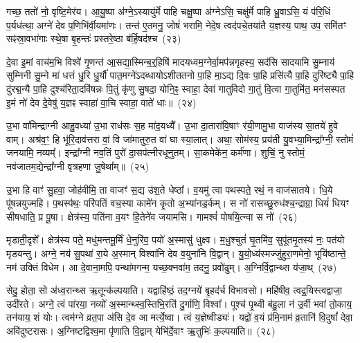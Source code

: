 गच्छ॒ ततो॑ नो॒ वृष्टि॒मेर॑य। आ॒यु॒ष्पा अ॑ग्ने॒\-ऽस्यायु॑र्मे पाहि चक्षु॒ष्पा अ॑ग्ने\-ऽसि॒ चक्षु॑र्मे पाहि ध्रु॒वा\-ऽसि॒ यं प॑रि॒धिं प॒र्यध॑त्था॒ अग्ने॑ देव प॒णिभि॑र्वी॒यमा॑णः। तन्त॑ ए॒तमनु॒ जोषं॑ भरामि॒ नेदे॒ष त्वद॑पचे॒तया॑तै य॒ज्ञस्य॒ पाथ॒ उप॒ समि॑तꣳ सꣴस्रा॒वभा॑गाः स्थे॒षा बृ॒हन्तः॑ प्रस्तरे॒ष्ठा ब॑र्\mbox{}हि॒षद॑श्च~(२३)\ip

दे॒वा इ॒मां वाच॑म॒भि विश्वे॑ गृ॒णन्त॑ आ॒सद्या॒स्मिन्ब॒र्॒हिषि॑ मादयध्वम॒ग्नेर्वा॒मप॑न्नगृहस्य॒ सद॑सि सादयामि सु॒म्नाय॑ सुम्निनी सु॒म्ने मा॑ धत्तं धु॒रि धु॒र्यौ॑ पात॒मग्ने॑\-ऽदब्धायो\-ऽशीततनो पा॒हि मा॒\-ऽद्य दि॒वः पा॒हि प्रसि॑त्यै पा॒हि दुरि॑ष्ट्यै पा॒हि दु॑रद्म॒न्यै पा॒हि दुश्च॑रिता॒दवि॑षन्नः पि॒तुं कृ॑णु सु॒षदा॒ योनि॒ꣴ॒ स्वाहा॒ देवा॑ गातुविदो गा॒तुं वि॒त्वा गा॒तुमि॑त॒ मन॑सस्पत इ॒मं नो॑ देव दे॒वेषु॑ य॒ज्ञꣴ स्वाहा॑ वा॒चि स्वाहा॒ वाते॑ धाः॥~(२४)\ip

{\anuvakamend[{दिव॑ञ्च वि॒त्वा गा॒तुन्त्रयो॑दश च}]}

उ॒भा वा॑मिन्द्राग्नी आहु॒वध्या॑ उ॒भा राध॑सः स॒ह मा॑द॒यध्यै᳚। उ॒भा दा॒तारा॑वि॒षाꣳ र॑यी॒णामु॒भा वाज॑स्य सा॒तये॑ हुवे वाम्। अश्र॑व॒ꣳ॒ हि भू॑रि॒दाव॑त्तरा वां॒ वि जा॑मातुरु॒त वा॑ घा स्या॒लात्। अथा॒ सोम॑स्य॒ प्रय॑ती यु॒वभ्या॒मिन्द्रा᳚ग्नी॒ स्तोमं॑ जनयामि॒ नव्यम्᳚। इन्द्रा᳚ग्नी नव॒तिं पुरो॑ दा॒सप॑त्नीरधूनुतम्। सा॒कमेके॑न॒ कर्म॑णा। शुचिं॒ नु स्तोमं॒ नव॑जातम॒द्येन्द्रा᳚ग्नी वृत्रहणा जु॒षेथा᳚म्॥~(२५)\ip

उ॒भा हि वाꣳ॑ सु॒हवा॒ जोह॑वीमि॒ ता वाजꣳ॑ स॒द्य उ॑श॒ते धेष्ठा᳚। व॒यमु॑ त्वा पथस्पते॒ रथं॒ न वाज॑सातये। धि॒ये पू॑षन्नयुज्महि। प॒थस्प॑थः॒ परि॑पतिं वच॒स्या कामे॑न कृ॒तो अ॒भ्या॑नड॒र्कम्। स नो॑ रासच्छु॒रुध॑श्च॒न्द्राग्रा॒ धियं॑ धियꣳ सीषधाति॒ प्र पू॒षा। क्षेत्र॑स्य॒ पति॑ना व॒यꣳ हि॒तेने॑व जयामसि। गामश्वं॑ पोषयि॒त्न्वा स नो॑~(२६)\ip

मृडाती॒दृशे᳚। क्षेत्र॑स्य पते॒ मधु॑मन्तमू॒र्मिं धे॒नुरि॑व॒ पयो॑ अ॒स्मासु॑ धुक्ष्व। म॒धु॒श्चुतं॑ घृ॒तमि॑व॒ सुपू॑तमृ॒तस्य॑ नः॒ पत॑यो मृडयन्तु। अग्ने॒ नय॑ सु॒पथा॑ रा॒ये अ॒स्मान् विश्वा॑नि देव व॒युना॑नि वि॒द्वान्। यु॒यो॒ध्य॑स्मज्जु॑हुरा॒णमेनो॒ भूयि॑ष्ठान्ते॒ नम॑ उक्तिं विधेम। आ दे॒वाना॒मपि॒ पन्था॑मगन्म॒ यच्छ॒क्नवा॑म॒ तदनु॒ प्रवो॑ढुम्। अ॒ग्निर्वि॒द्वान्थ्स य॑जा॒थ्~(२७)\ip

सेदु॒ होता॒ सो अ॑ध्व॒रान्थ्स ऋ॒तून्क॑ल्पयाति। यद्वा\-हि॑ष्ठं॒ तद॒ग्नये॑ बृ॒हद॑र्च विभावसो। महि॑षीव॒ त्वद्र॒यिस्त्वद्वाजा॒ उदी॑रते। अग्ने॒ त्वं पा॑रया॒ नव्यो॑ अ॒स्मान्थ्स्व॒स्तिभि॒रति॑ दु॒र्गाणि॒ विश्वा᳚। पूश्च॑ पृ॒थ्वी ब॑हु॒ला न॑ उ॒र्वी भवा॑ तो॒काय॒ तन॑याय॒ शं योः। त्वम॑ग्ने व्रत॒पा अ॑सि दे॒व आ मर्त्ये॒ष्वा। त्वं य॒ज्ञेष्वीड्यः॑। यद्वो॑ व॒यं प्र॑मि॒नाम॑ व्र॒तानि॑ वि॒दुषां᳚ देवा॒ अवि॑दुष्टरासः। अ॒ग्निष्टद्विश्व॒मा पृ॑णाति वि॒द्वान् येभि॑र्दे॒वाꣳ ऋ॒तुभिः॑ क॒ल्पया॑ति॥~(२८)\ip

